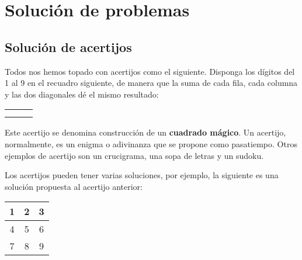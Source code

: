
\chapter{Solución de problemas}

\section{Solución de acertijos}

Todos nos hemos topado con acertijos como el siguiente. Disponga 
los dígitos del 1 al 9 en el recuadro siguiente, de manera que la suma de cada fila, cada columna y las dos diagonales dé el mismo resultado:
\begin{center}
	\begin{tabular}{|c|c|c|}
		\hline 
		 &  & \tabularnewline
		\hline 
		 &  & \tabularnewline
		\hline 
		 &  & \tabularnewline
		\hline
	\end{tabular}
\end{center}

Este acertijo  se denomina construcción de un { \bf cuadrado mágico}. Un 
acertijo, normalmente, es un enigma o adivinanza que se propone como 
pasatiempo. Otros ejemplos de acertijo son un crucigrama, una sopa de letras y 
un sudoku.

Los acertijos pueden tener varias soluciones, por ejemplo, la siguiente es una solución propuesta al acertijo anterior:

\begin{center}
	\begin{tabular}{|c|c|c|}
		\hline 
		1 & 2 & 3\tabularnewline
		\hline
		4 & 5 & 6\tabularnewline
		\hline 
		7 & 8 & 9 \tabularnewline
		\hline
	\end{tabular}
\end{center}

